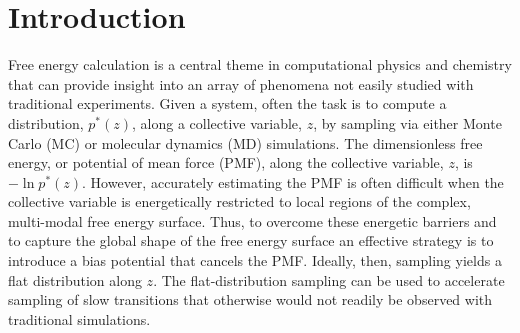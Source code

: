 \documentclass[reprint, superscriptaddress, floatfix]{revtex4-1}
\begin{document}
\section{Introduction}



Free energy calculation\cite{frenkel, newman} is a central theme
in computational physics and chemistry
that can provide insight into an array of phenomena not easily studied
with traditional experiments.
%
Given a system,
often the task is to compute
a distribution, $p^*(z)$,
along a collective variable, $z$, by sampling via either Monte Carlo\cite{
  frenkel, newman, landau_binder} (MC)
or molecular dynamics\cite{frenkel, karplus2002} (MD) simulations.
%
The dimensionless free energy, or potential of mean force (PMF),
along the collective variable, $z$,
is $-\ln p^*(z)$.
%
However, accurately estimating the PMF is often difficult
when the collective variable is energetically restricted to local regions
of the complex, multi-modal free energy surface.
%
Thus,
to overcome these energetic barriers and
to capture the global shape of the free energy surface
an effective strategy is to introduce a bias potential that
cancels the PMF.
%
Ideally, then, sampling yields a flat distribution
along $z$\cite{mezei1987, berg1992, *lee1993,
wang2001, *wang2001pre,
huber1994,
*laio2002, *laio2008, *barducci2011, *sutto2012}.
%
The flat-distribution sampling can be used to accelerate
sampling of slow transitions that otherwise would not readily
be observed with traditional simulations.
%
\end{document}

